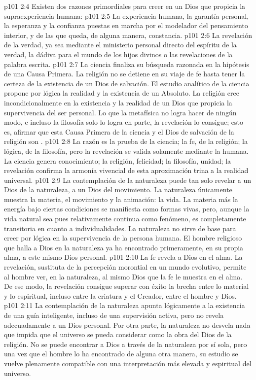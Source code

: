\vs p101 2:4 Existen dos razones primordiales para creer en un Dios que propicia la supraexperiencia humana:
\vs p101 2:5 La experiencia humana, la garantía personal, la esperanza y la confianza puestas en marcha por el modelador del pensamiento interior, y de las que queda, de alguna manera, constancia.
\vs p101 2:6 La revelación de la verdad, ya sea mediante el ministerio personal directo del espíritu de la verdad, la dádiva para el mundo de los hijos divinos o las revelaciones de la palabra escrita.
\vs p101 2:7 \pc La ciencia finaliza su búsqueda razonada en la hipótesis de una Causa Primera. La religión no se detiene en su viaje de fe hasta tener la certeza de la existencia de un Dios de salvación. El estudio analítico de la ciencia propone por lógica la realidad y la existencia de un Absoluto. La religión cree incondicionalmente en la existencia y la realidad de un Dios que propicia la supervivencia del ser personal. Lo que la metafísica no logra hacer de ningún modo, e incluso la filosofía solo lo logra en parte, la revelación lo consigue; esto es, afirmar que esta Causa Primera de la ciencia y el Dios de salvación de la religión son .
\vs p101 2:8 \pc La razón es la prueba de la ciencia; la fe, de la religión; la lógica, de la filosofía, pero la revelación se valida solamente mediante la  humana. La ciencia genera conocimiento; la religión, felicidad; la filosofía, unidad; la revelación confirma la armonía vivencial de esta aproximación trina a la realidad universal.
\vs p101 2:9 La contemplación de la naturaleza puede tan solo revelar a un Dios de la naturaleza, a un Dios del movimiento. La naturaleza únicamente muestra la materia, el movimiento y la animación: la vida. La materia más la energía bajo ciertas condiciones se manifiesta como formas vivas, pero, aunque la vida natural sea pues relativamente continua como fenómeno, es completamente transitoria en cuanto a individualidades. La naturaleza no sirve de base para creer por lógica en la supervivencia de la persona humana. El hombre religioso que halla a Dios en la naturaleza ya ha encontrado primeramente, en su propia alma, a este mismo Dios personal.
\vs p101 2:10 \pc La fe revela a Dios en el alma. La revelación, sustituta de la percepción morontial en un mundo evolutivo, permite al hombre ver, en la naturaleza, al mismo Dios que la fe le muestra en el alma. De ese modo, la revelación consigue superar con éxito la brecha entre lo material y lo espiritual, incluso entre la criatura y el Creador, entre el hombre y Dios.
\vs p101 2:11 La contemplación de la naturaleza apunta lógicamente a la existencia de una guía inteligente, incluso de una supervisión activa, pero no revela adecuadamente a un Dios personal. Por otra parte, la naturaleza no desvela nada que impida que el universo se pueda considerar como la obra del Dios de la religión. No se puede encontrar a Dios a través de la naturaleza por sí sola, pero una vez que el hombre lo ha encontrado de alguna otra manera, su estudio se vuelve plenamente compatible con una interpretación más elevada y espiritual del universo.
